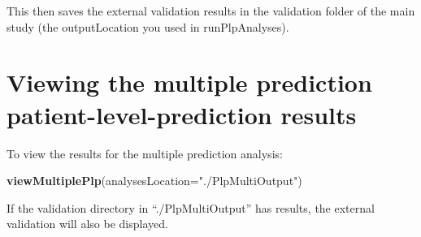 \documentclass[]{article}
\newenvironment{Shaded}{\begin{snugshade}}{\end{snugshade}}
\newcommand{\KeywordTok}[1]{\textcolor[rgb]{0.13,0.29,0.53}{\textbf{#1}}}
\newcommand{\DataTypeTok}[1]{\textcolor[rgb]{0.13,0.29,0.53}{#1}}
\newcommand{\StringTok}[1]{\textcolor[rgb]{0.31,0.60,0.02}{#1}}
\newcommand{\NormalTok}[1]{#1}
\begin{document}
This then saves the external validation results in the validation folder
of the main study (the outputLocation you used in runPlpAnalyses).

\section{Viewing the multiple prediction patient-level-prediction
results}\label{viewing-the-multiple-prediction-patient-level-prediction-results}

To view the results for the multiple prediction analysis:

\begin{Shaded}
\begin{Highlighting}[]
\KeywordTok{viewMultiplePlp}\NormalTok{(}\DataTypeTok{analysesLocation=}\StringTok{"./PlpMultiOutput"}\NormalTok{)}
\end{Highlighting}
\end{Shaded}

If the validation directory in ``./PlpMultiOutput'' has results, the
external validation will also be displayed.
\end{document}
